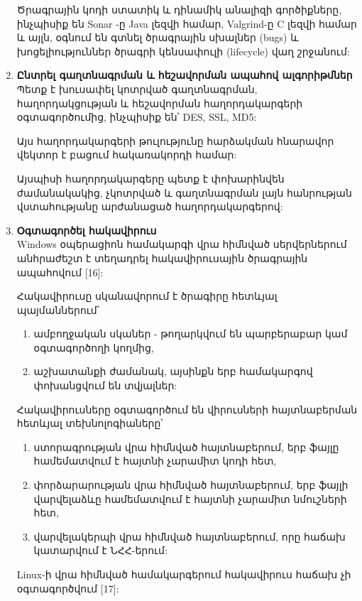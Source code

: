 \documentclass[a4paper,12pt]{article}
\begin{document}
\begin{sloppypar}
\begin{enumerate}
    Ծրագրային կոդի ստատիկ և դինամիկ անալիզի գործիքները, ինչպիսիք են
    Sonar -ը Java լեզվի համար, Valgrind-ը C լեզվի համար և այլն,
    օգնում են գտնել ծրագրային սխալներ (bugs) և խոցելիություններ ծրագրի
    կենսափուլի (lifecycle) վաղ շրջանում:
\item \textbf{Ընտրել գաղտնագրման և հեշավորման ապահով ալգորիթմներ}\\
    Պետք է խուսափել կոտրված գաղտնագրման, հաղորդակցության և
    հեշավորման հաղորդակարգերի օգտագործումից, ինչպիսիք են՝
	DES, SSL, MD5:

    Այս հաղորդակարգերի թուլությունը հարձակման հնարավոր
    վեկտոր է բացում հակառակորդի համար:

    Այսպիսի հաղորդակարգերը պետք է փոխարինվեն ժամանակակից,
    չկոտրված և գաղտնագրման լայն հանրության վստահությանը արժանացած
    հաղորդակարգերով:
\item \textbf{Օգտագործել հակավիրուս}\\
	Windows օպերացիոն համակարգի վրա հիմնված սերվերներում անհրաժեշտ է տեղադրել
	հակավիրուսային ծրագրային ապահովում [16]:

	Հակավիրուսը սկանավորում է ծրագիրը հետևյալ պայմաններում՝
	\begin{enumerate}
		\item ամբողջական սկաներ - թողարկվում են պարբերաբար կամ օգտագործողի կողմից,
		\item աշխատանքի ժամանակ, այսինքն երբ համակարգով փոխանցվում են տվյալներ:
	\end{enumerate}

	Հակավիրուսները օգտագործում են վիրուսների հայտնաբերման հետևյալ տեխնոլոգիաները՝

	\begin{enumerate}
	\item ստորագրության վրա հիմնված հայտնաբերում, երբ ֆայլը համեմատվում է հայտնի չարամիտ կոդի հետ,
	\item փորձարարության վրա հիմնված հայտնաբերում, երբ ֆայլի վարվելաձևը համեմատվում է հայտնի չարամիտ նմուշների հետ,
	\item վարվելակերպի վրա հիմնված հայտնաբերում, որը հաճախ կատարվում է ՆՀՀ-երում:
	\end{enumerate}

	Linux-ի վրա հիմնված համակարգերում հակավիրուս հաճախ չի օգտագործվում [17]:


\end{enumerate}
\end{sloppypar}
\end{document}
